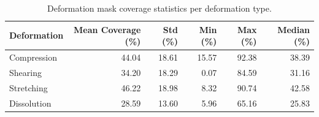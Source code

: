 \begin{table}[htbp]
\caption{Deformation mask coverage statistics per deformation type.}
\label{tab:mask_coverage}
\begin{tabular}{lrrrrr}
\toprule
Deformation & Mean Coverage (\%) & Std (\%) & Min (\%) & Max (\%) & Median (\%) \\
\midrule
Compression & 44.04 & 18.61 & 15.57 & 92.38 & 38.39 \\
Shearing & 34.20 & 18.29 & 0.07 & 84.59 & 31.16 \\
Stretching & 46.22 & 18.98 & 8.32 & 90.74 & 42.58 \\
Dissolution & 28.59 & 13.60 & 5.96 & 65.16 & 25.83 \\
\bottomrule
\end{tabular}
\end{table}
